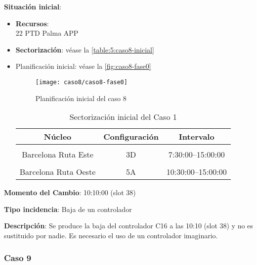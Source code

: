 \textbf{Situación inicial}:
\begin{itemize}[label={}]
	
	\item \textbf{Recursos}: \\
	22 PTD Palma APP \\
	
	
	\item \textbf{Sectorización}: véase la \autoref{table:5:caso8-inicial}
	
	\item Planificación inicial: véase la \autoref{fig:caso8-fase0}
	
	\begin{figure}[!h]
		\centering
		\texttt{[image: caso8/caso8-fase0]}
		\caption{Planificación inicial del caso 8}
		\label{fig:caso8-fase0}
	\end{figure}

	\begin{table}[h]
		\centering
		\caption{Sectorización inicial del Caso 1}
		\begin{tabular}{ccc}
			\hline
			\textbf{Núcleo}      & \textbf{Configuración} & \textbf{Intervalo}   \\ \hline
			\multicolumn{1}{l}{} & \multicolumn{1}{l}{}   & \multicolumn{1}{l}{} \\
			Barcelona Ruta Este  & 3D                     & 7:30:00--15:00:00    \\
			\multicolumn{1}{l}{} & \multicolumn{1}{l}{}   & \multicolumn{1}{l}{} \\
			Barcelona Ruta Oeste & 5A                     & 10:30:00--15:00:00   \\ \hline
		\end{tabular}
		\label{table:5:caso8-inicial}
	\end{table}
	
\end{itemize}

\textbf{Momento del Cambio}: 10:10:00 (slot 38)

\textbf{Tipo incidencia}: Baja de un controlador

\textbf{Descripción}: Se produce la baja del controlador C16 a las 10:10 (slot 38) y no es sustituido por nadie. Es necesario el uso de un controlador imaginario.


\subsubsection{Caso 9}


